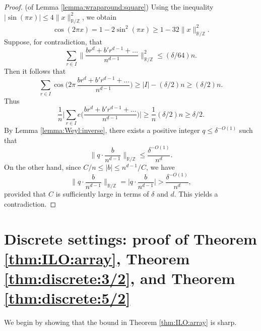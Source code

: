 \documentclass[reqno]{amsart}
\newcommand\R{{\mathbb{R}}}
\newcommand\Z{{\mathbb{Z}}}
\renewcommand\P{{\mathbb{P}}}
\theoremstyle{plain}
\theoremstyle{definition}
\begin{document}
\begin{proof}(of Lemma \ref{lemma:wraparound:square})  Using the inequality $|\sin(\pi x)| \le 4 \|x\|_{\R/\Z}^2$, we obtain
\[
\cos(2\pi x)=1-2 \sin^2(\pi x) \ge 1-32 \|x\|_{\R/\Z}^2.
\]
Suppose, for contradiction, that
\[
\sum_{r\in I} \Big\| \frac{b r^d + b' r^{d-1} + \dots}{n^{d-1}} \Big\|_{\R/\Z}^2 \le (\delta/64) n.
\]
Then it follows that
\[ 
\sum_{r\in I} \cos\Big(2\pi \,\frac{b r^d + b' r^{d-1} + \dots}{n^{d-1}}\Big) \ge |I|-(\delta/2)n \ge (\delta/2)n.
\]
Thus
\[ 
\frac{1}{n}\Big| \sum_{r\in I} e\Big(\frac{b r^d + b' r^{d-1} + \dots}{n^{d-1}}\Big) \Big| \ge \frac{1}{n}(\delta/2)n \ge \delta/2. 
\]
By Lemma \ref{lemma:Weyl:inverse}, there exists a positive integer $q \le \delta^{{-O(1)}}$ such that
\[
\Big\| q \cdot \frac{b}{n^{d-1}} \Big\|_{\R/\Z} \le \frac{\delta^{{-O(1)}}}{n^d}.
\]
On the other hand, since $C/n\le |b| \le n^{d-1}/C$, we have 
\[
\Big\| q \cdot \frac{b}{n^{d-1}} \Big\|_{\R/\Z}=\Big| q \cdot \frac{b}{n^{d-1}} \Big|>\frac{\delta^{{-O(1)}}}{n^d},
\]
provided that $C$ is sufficiently large in terms of $\delta$ and $d$. This yields a contradiction.
\end{proof}






\section{Discrete settings: proof of Theorem \ref{thm:ILO:array}, Theorem \ref{thm:discrete:3/2}, and Theorem \ref{thm:discrete:5/2}} \label{sect:discrete}


We begin by showing that the bound in Theorem \ref{thm:ILO:array} is sharp.
\end{document}
